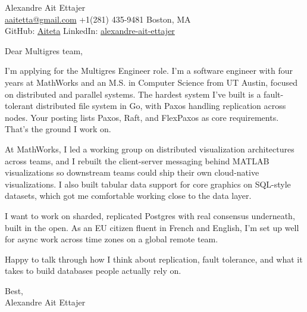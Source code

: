 \documentclass{article}
\begin{document}
\begin{flushleft}
    {\Large Alexandre Ait Ettajer} \\
    \href{mailto:aaitetta@gmail.com}{aaitetta@gmail.com} \quad +1(281) 435-9481 \quad Boston, MA \\
    GitHub: \href{https://github.com/aiteta}{Aiteta} \quad LinkedIn: \href{https://www.linkedin.com/in/alexandre-ait-ettajer-65740b170/}{alexandre-ait-ettajer}
\end{flushleft}

\vspace{1em}

Dear Multigres team,

I'm applying for the Multigres Engineer role. I'm a software engineer with four years at MathWorks and an M.S. in Computer Science from UT Austin, focused on distributed and parallel systems. The hardest system I've built is a fault-tolerant distributed file system in Go, with Paxos handling replication across nodes. Your posting lists Paxos, Raft, and FlexPaxos as core requirements. That's the ground I work on.

At MathWorks, I led a working group on distributed visualization architectures across teams, and I rebuilt the client-server messaging behind MATLAB visualizations so downstream teams could ship their own cloud-native visualizations. I also built tabular data support for core graphics on SQL-style datasets, which got me comfortable working close to the data layer.

I want to work on sharded, replicated Postgres with real consensus underneath, built in the open. As an EU citizen fluent in French and English, I'm set up well for async work across time zones on a global remote team.

Happy to talk through how I think about replication, fault tolerance, and what it takes to build databases people actually rely on.

Best, \\
Alexandre Ait Ettajer
\end{document}
